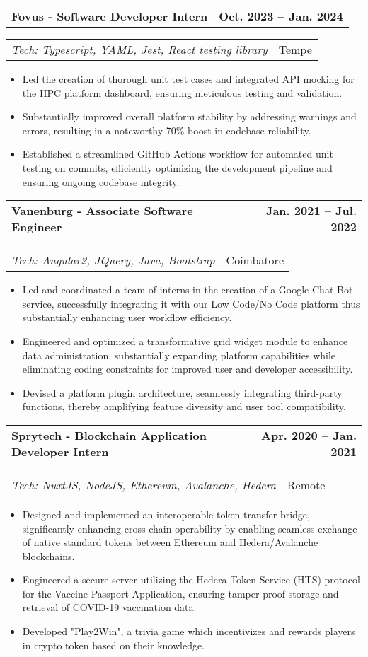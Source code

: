 \documentclass[letterpaper,11pt]{article}
\makeatletter
\newcommand{\resumeItem}[1]{
  \item\small{
    {#1 \vspace{-2pt}}
  }
}
\newcommand{\resumeSubheading}[2]{
  \vspace{-2pt}\item
    \begin{tabular*}{1.0\textwidth}[t]{l@{\extracolsep{\fill}}r}
      \textbf{#1} & \textbf{\small #2} \\
    \end{tabular*}\vspace{-7pt}
}
\newcommand{\resumeSubText}[2]{
  \vspace{-14pt}\item
    \begin{tabular*}{1.0\textwidth}[t]{l@{\extracolsep{\fill}}r}
      {#1} & {\small #2} \\
    \end{tabular*}\vspace{-7pt}
}
\newcommand{\resumeItemListStart}{\begin{itemize}}
\newcommand{\resumeItemListEnd}{\end{itemize}\vspace{-5pt}}
\makeatother
\begin{document}
    \resumeSubheading
      {Fovus - Software Developer Intern}{Oct. 2023 -- Jan. 2024}
    \resumeSubText {\emph{Tech: Typescript, YAML, Jest, React testing library}}{Tempe}
      \resumeItemListStart
        \resumeItem{Led the creation of thorough unit test cases and integrated API mocking for the HPC platform dashboard, ensuring meticulous testing and validation.}
        \resumeItem{Substantially improved overall platform stability by addressing warnings and errors, resulting in a noteworthy 70\% boost in codebase reliability.}
        \resumeItem{Established a streamlined GitHub Actions workflow for automated unit testing on commits, efficiently optimizing the development pipeline and ensuring ongoing codebase integrity.}
      \resumeItemListEnd

    \resumeSubheading
      {Vanenburg - Associate Software Engineer}{Jan. 2021 -- Jul. 2022}
    \resumeSubText {\emph{Tech: Angular2, JQuery, Java, Bootstrap}}{Coimbatore}
      \resumeItemListStart
        \resumeItem{Led and coordinated a team of interns in the creation of a Google Chat Bot service, successfully integrating it with our Low Code/No Code platform thus substantially enhancing user workflow efficiency.}
        \resumeItem{Engineered and optimized a transformative grid widget module to enhance data administration, substantially expanding platform capabilities while eliminating coding constraints for improved user and developer accessibility.}
        \resumeItem{Devised a platform plugin architecture, seamlessly integrating third-party functions, thereby amplifying feature diversity and user tool compatibility.}
      \resumeItemListEnd

    \resumeSubheading
      {Sprytech - Blockchain Application Developer Intern}{Apr. 2020 -- Jan. 2021}
      \resumeSubText{\emph{Tech: NuxtJS, NodeJS, Ethereum, Avalanche, Hedera}}{Remote}
      \resumeItemListStart
        \resumeItem{Designed and implemented an interoperable token transfer bridge, significantly enhancing cross-chain operability by enabling seamless exchange of native standard tokens between Ethereum and Hedera/Avalanche blockchains.}
        \resumeItem{Engineered a secure server utilizing the Hedera Token Service (HTS) protocol for the Vaccine Passport Application, ensuring tamper-proof storage and retrieval of COVID-19 vaccination data.}
        \resumeItem{Developed "Play2Win", a trivia game which incentivizes and rewards players in crypto token based on their knowledge.}
    \resumeItemListEnd
    
    
\end{document}
